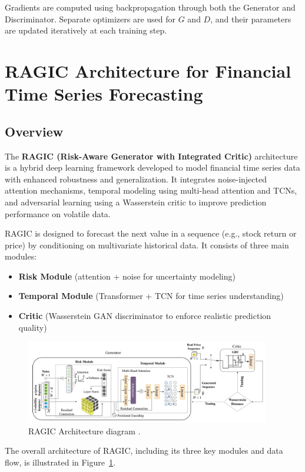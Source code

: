 Gradients are computed using backpropagation through both the Generator and Discriminator. Separate optimizers are used for $G$ and $D$, and their parameters are updated iteratively at each training step.

\section{RAGIC Architecture for Financial Time Series Forecasting}

\subsection{Overview}

The \textbf{RAGIC (Risk-Aware Generator with Integrated Critic)} architecture is a hybrid deep learning framework developed to model financial time series data with enhanced robustness and generalization. It integrates noise-injected attention mechanisms, temporal modeling using multi-head attention and TCNs, and adversarial learning using a Wasserstein critic to improve prediction performance on volatile data.

RAGIC is designed to forecast the next value in a sequence (e.g., stock return or price) by conditioning on multivariate historical data. It consists of three main modules:
\begin{itemize}
    \item \textbf{Risk Module} (attention + noise for uncertainty modeling)
    \item \textbf{Temporal Module} (Transformer + TCN for time series understanding)
    \item \textbf{Critic} (Wasserstein GAN discriminator to enforce realistic prediction quality)
\end{itemize}

\begin{figure}[H]
    \centering
    \includegraphics[width=0.95\textwidth]{Images/Screenshot 2025-05-19 at 15.00.48.png}
    \caption{RAGIC Architecture diagram \cite{gu_ragic_2025}.}
    \label{fig:ragic_architecture}
\end{figure}
The overall architecture of RAGIC, including its three key modules and data flow, is illustrated in Figure~\ref{fig:ragic_architecture}.

